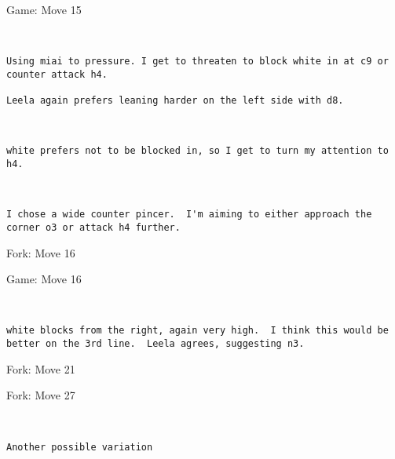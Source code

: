 \documentclass{article}
\begin{document}
\newpage
\begin{section}{Game: Move 15}
\begin{center}
\cleargoban
{}
\showfullgoban
\\\begin{lstlisting}
Using miai to pressure. I get to threaten to block white in at c9 or counter attack h4.  

Leela again prefers leaning harder on the left side with d8. 
\end{lstlisting}
\end{center}
\begin{center}
\cleargoban
{}
\showfullgoban
\\\begin{lstlisting}
white prefers not to be blocked in, so I get to turn my attention to h4. 
\end{lstlisting}
\end{center}
\begin{center}
\cleargoban
{}
\showfullgoban
\\\begin{lstlisting}
I chose a wide counter pincer.  I'm aiming to either approach the corner o3 or attack h4 further.  
\end{lstlisting}
\end{center}
\end{section}
\begin{subsection}{Fork: Move 16}
\end{subsection}
\newpage
\begin{section}{Game: Move 16}
\begin{center}
\cleargoban
{}
\showfullgoban
\\\begin{lstlisting}
white blocks from the right, again very high.  I think this would be better on the 3rd line.  Leela agrees, suggesting n3.  
\end{lstlisting}
\end{center}
\end{section}
\begin{subsection}{Fork: Move 21}
\end{subsection}
\begin{subsection}{Fork: Move 27}
\begin{center}
\cleargoban
{}
\showfullgoban
\\\begin{lstlisting}
Another possible variation
\end{lstlisting}
\end{center}
\end{subsection}
\end{document}
